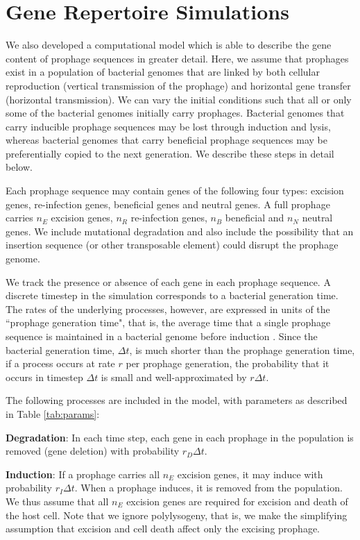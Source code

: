 \section{Gene Repertoire Simulations}

We also developed a computational model which is able to describe the gene content of prophage sequences in greater detail.  Here, we assume that prophages exist in a population of bacterial genomes that are linked by both cellular reproduction (vertical transmission of the prophage) and horizontal gene transfer (horizontal transmission).  We can vary the initial conditions such that all or only some of the bacterial genomes initially carry prophages.  Bacterial genomes that carry inducible prophage sequences may be lost through induction and lysis, whereas bacterial genomes that carry beneficial prophage sequences may be preferentially copied to the next generation.  We describe these steps in detail below.

Each prophage sequence may contain genes of the following four types: excision genes, re-infection genes, beneficial genes and neutral genes.  A full prophage carries $n_E$ excision genes, $n_R$ re-infection genes, $n_B$ beneficial and $n_N$ neutral genes.  We include mutational degradation and also include the possibility that an insertion sequence (or other transposable element) could disrupt the prophage genome. 

We track the presence or absence of each gene in each prophage sequence. A discrete timestep in the simulation corresponds to a bacterial generation time.  The rates of the underlying processes, however, are expressed in units of the ``prophage generation time", that is, the average time that a single prophage sequence is maintained in a bacterial genome before induction \cite{khan_quantifying_2019}.  Since the bacterial generation time, $\Delta t$, is much shorter than the prophage generation time, if a process occurs at rate $r$ per prophage generation, the probability that it occurs in timestep $\Delta t$ is small and well-approximated by $r \Delta t$.

The following processes are included in the model, with parameters as described in Table \ref{tab:params}:

{\bf Degradation}:  In each time step, each gene in each prophage in the population is removed (gene deletion) with probability $r_{D} \Delta t $. 

{\bf Induction}: If a prophage carries all $n_E$ excision genes, it may induce with probability $r_I \Delta t$.  When a prophage induces, it is removed from the population.  We thus assume that all $n_E$ excision genes are required for excision and death of the host cell.  Note that we ignore polylysogeny, that is, we make the simplifying assumption that excision and cell death affect only the excising prophage.

